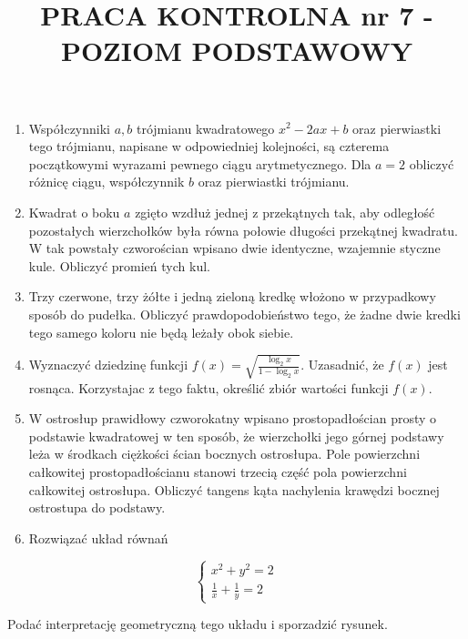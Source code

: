 \documentclass[10pt]{article}
\title{PRACA KONTROLNA nr 7 -POZIOM PODSTAWOWY }
\author{}
\date{}
\begin{document}
\maketitle
\begin{enumerate}
  \item Współczynniki $a, b$ trójmianu kwadratowego $x^{2}-2 a x+b$ oraz pierwiastki tego trójmianu, napisane w odpowiedniej kolejności, są czterema początkowymi wyrazami pewnego ciągu arytmetycznego. Dla $a=2$ obliczyć różnicę ciągu, współczynnik $b$ oraz pierwiastki trójmianu.
  \item Kwadrat o boku $a$ zgięto wzdłuż jednej z przekątnych tak, aby odległość pozostałych wierzchołków była równa połowie długości przekątnej kwadratu. W tak powstały czworościan wpisano dwie identyczne, wzajemnie styczne kule. Obliczyć promień tych kul.
  \item Trzy czerwone, trzy żółte i jedną zieloną kredkę włożono w przypadkowy sposób do pudełka. Obliczyć prawdopodobieństwo tego, że żadne dwie kredki tego samego koloru nie będą leżały obok siebie.
  \item Wyznaczyć dziedzinę funkcji $f(x)=\sqrt{\frac{\log _{2} x}{1-\log _{2} x}}$. Uzasadnić, że $f(x)$ jest rosnąca. Korzystajac z tego faktu, określić zbiór wartości funkcji $f(x)$.
  \item W ostrosłup prawidłowy czworokatny wpisano prostopadłościan prosty o podstawie kwadratowej w ten sposób, że wierzchołki jego górnej podstawy leża w środkach ciężkości ścian bocznych ostrosłupa. Pole powierzchni całkowitej prostopadłościanu stanowi trzecią część pola powierzchni całkowitej ostrosłupa. Obliczyć tangens kąta nachylenia krawędzi bocznej ostrostupa do podstawy.
  \item Rozwiązać układ równań
\end{enumerate}

$$
\left\{\begin{array}{l}
x^{2}+y^{2}=2 \\
\frac{1}{x}+\frac{1}{y}=2
\end{array}\right.
$$

Podać interpretację geometryczną tego układu i sporzadzić rysunek.
\end{document}
